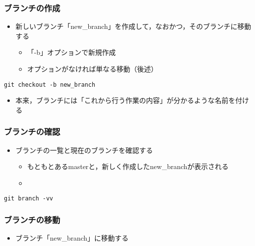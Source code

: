 \documentclass[a4paper,twoside,twocolumn]{bxjsarticle}
\begin{document}
\subsubsection{ブランチの作成}
\label{sec-1-6-3}
\begin{itemize}
\item 新しいブランチ「new\_branch」を作成して，なおかつ，そのブランチに移動する
\begin{itemize}
\item 「-b」オプションで新規作成
\item オプションがなければ単なる移動（後述）
\end{itemize}
\end{itemize}

\begin{verbatim}
git checkout -b new_branch
\end{verbatim}

\begin{itemize}
\item 本来，ブランチには「これから行う作業の内容」が分かるような名前を付ける
\end{itemize}

\subsubsection{ブランチの確認}
\label{sec-1-6-4}
\begin{itemize}
\item ブランチの一覧と現在のブランチを確認する
\begin{itemize}
\item もともとあるmasterと，新しく作成したnew\_branchが表示される
\item 
\end{itemize}
\end{itemize}

\begin{verbatim}
git branch -vv
\end{verbatim}

\subsubsection{ブランチの移動}
\label{sec-1-6-5}

\begin{itemize}
\item ブランチ「new\_branch」に移動する
\end{itemize}
\end{document}

